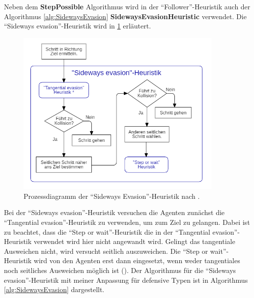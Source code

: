 Neben dem \textbf{StepPossible} Algorithmus wird in der "`Follower"'-Heuristik auch der Algorithmus \ref{alg:SidewaysEvasion} \textbf{SidewaysEvasionHeuristic} verwendet. Die "`Sideways evasion"'-Heuristik wird in \figurename \ref{fig:sidewayHeuristik} erläutert.
\begin{figure}[H]
	\centering
		\includegraphics[width=0.9\textwidth]{pictures/model/algorithm/heuristics/sideways_evasion_heuristic.png}
	\caption{Prozessdiagramm der "`Sideways Evasion"'-Heuristik nach \cite{Seitz.2016}.}
	\label{fig:sidewayHeuristik}
\end{figure} 
Bei der "`Sideways evasion"'-Heuristik versuchen die Agenten zunächst die "`Tangential evasion"'-Heuristik zu verwenden, um zum Ziel zu gelangen. Dabei ist zu beachtet, dass die "`Step or wait"'-Heuristik die in  der "`Tangential evasion"'-Heuristik verwendet wird hier nicht angewandt wird. Gelingt das tangentiale Ausweichen nicht, wird versucht seitlich auszuweichen. Die "`Step or wait"'-Heuristik wird von den Agenten erst dann eingesetzt, wenn weder tangentiales noch seitliches Ausweichen möglich ist (\cite{Seitz.2016}). Der Algorithmus für die "`Sideways evasion"'-Heuristik mit meiner Anpassung für defensive Typen ist in Algorithmus \ref{alg:SidewaysEvasion} dargestellt.
\clearpage
